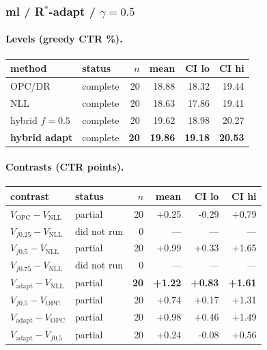 \documentclass[10pt,a4paper]{article}
\begin{document}
\subsubsection{ml / R$^*$-adapt / $\gamma=0.5$}
\paragraph{Levels (greedy CTR \%).}
{\centering\small\begin{tabular}{llrrrr}
\toprule method & status & $n$ & mean & CI lo & CI hi \\
\midrule
OPC/DR & complete & 20 & 18.88 & 18.32 & 19.44 \\
NLL & complete & 20 & 18.63 & 17.86 & 19.41 \\
hybrid $f{=}0.5$ & complete & 20 & 19.62 & 18.98 & 20.27 \\
\textbf{hybrid adapt} & complete & \textbf{20} & \textbf{19.86} & \textbf{19.18} & \textbf{20.53} \\
\bottomrule\end{tabular}\par}
\paragraph{Contrasts (CTR points).}
{\centering\small\begin{tabular}{llrrrr}
\toprule contrast & status & $n$ & mean & CI lo & CI hi \\
\midrule
$V_{\mathrm{OPC}}-V_{\mathrm{NLL}}$ & partial & 20 & +0.25 & -0.29 & +0.79 \\
$V_{f0.25}-V_{\mathrm{NLL}}$ & did not run & 0 & --- & --- & --- \\
$V_{f0.5}-V_{\mathrm{NLL}}$ & partial & 20 & +0.99 & +0.33 & +1.65 \\
$V_{f0.75}-V_{\mathrm{NLL}}$ & did not run & 0 & --- & --- & --- \\
\textbf{$V_{\mathrm{adapt}}-V_{\mathrm{NLL}}$} & partial & \textbf{20} & \textbf{+1.22} & \textbf{+0.83} & \textbf{+1.61} \\
$V_{f0.5}-V_{\mathrm{OPC}}$ & partial & 20 & +0.74 & +0.17 & +1.31 \\
$V_{\mathrm{adapt}}-V_{\mathrm{OPC}}$ & partial & 20 & +0.98 & +0.46 & +1.49 \\
$V_{\mathrm{adapt}}-V_{f0.5}$ & partial & 20 & +0.24 & -0.08 & +0.56 \\
\bottomrule\end{tabular}\par}
\end{document}
